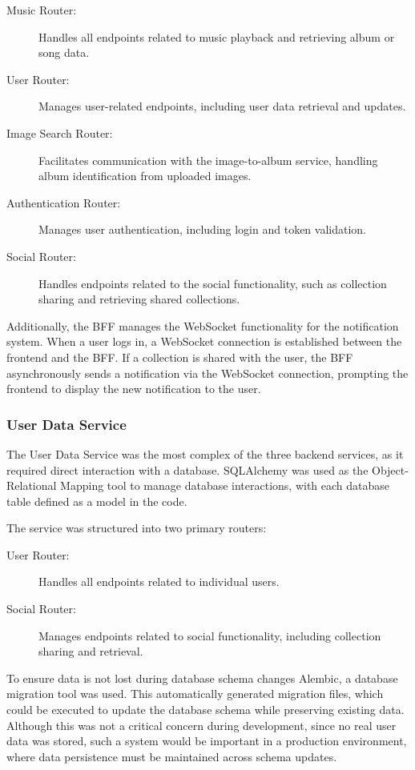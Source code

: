 \begin{description}
    \item[Music Router:] Handles all endpoints related to music playback and retrieving album or song data.
    \item[User Router:] Manages user-related endpoints, including user data retrieval and updates.
    \item[Image Search Router:] Facilitates communication with the image-to-album service, handling album identification from uploaded images.
    \item[Authentication Router:] Manages user authentication, including login and token validation.
    \item[Social Router:] Handles endpoints related to the social functionality, such as collection sharing and retrieving shared collections.
\end{description}

Additionally, the BFF manages the WebSocket functionality for the notification system. When a user logs in, a WebSocket connection is established between the frontend and the BFF. If a collection is shared with the user, the BFF asynchronously sends a notification via the WebSocket connection, prompting the frontend to display the new notification to the user.

\subsubsection{User Data Service}
The User Data Service was the most complex of the three backend services, as it required direct interaction with a database. SQLAlchemy was used as the Object-Relational Mapping tool to manage database interactions, with each database table defined as a model in the code.

The service was structured into two primary routers:

\begin{description}
    \item[User Router:] Handles all endpoints related to individual users.
    \item[Social Router:] Manages endpoints related to social functionality, including collection sharing and retrieval.
\end{description}

To ensure data is not lost during database schema changes Alembic, a database migration tool was used. This automatically generated migration files, which could be executed to update the database schema while preserving existing data. Although this was not a critical concern during development, since no real user data was stored, such a system would be important in a production environment, where data persistence must be maintained across schema updates.

